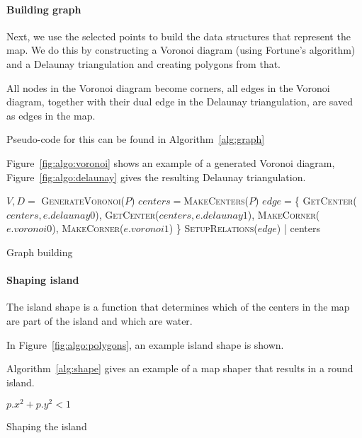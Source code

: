 \paragraph{Building graph}

Next, we use the selected points to build the data structures that represent the map.
We do this by constructing a Voronoi diagram (using Fortune's algorithm) and a Delaunay triangulation and creating polygons from that.

All nodes in the Voronoi diagram become corners, all edges in the Voronoi diagram, together with their dual edge in the Delaunay triangulation, are saved as edges in the map.

Pseudo-code for this can be found in Algorithm~\ref{alg:graph}

Figure~\ref{fig:algo:voronoi} shows an example of a generated Voronoi diagram, Figure~\ref{fig:algo:delaunay} gives the resulting Delaunay triangulation.

\begin{algo}[H]
\begin{sourcecode}
$V, D =$ \textsc{GenerateVoronoi}($P$)
$centers = $\textsc{MakeCenters}($P$)
	$edge = $\{
		\textsc{GetCenter}($centers, e.delaunay0$),
		\textsc{GetCenter}($centers, e.delaunay1$),
		\textsc{MakeCorner}($e.voronoi0$),
		\textsc{MakeCorner}($e.voronoi1$)
	\}
	\textsc{SetupRelations}($edge$)
|
\return centers
\qend
\end{sourcecode}
	\caption{Graph building}
	\label{alg:graph}
\end{algo}

\paragraph{Shaping island}

The island shape is a function that determines which of the centers in the map are part of the island and which are water.

In Figure~\ref{fig:algo:polygons}, an example island shape is shown.

Algorithm~\ref{alg:shape} gives an example of a map shaper that results in a round island.

\begin{algo}[H]
\begin{sourcecode}
\return $p.x^2 + p.y^2 < 1$
\qend
\end{sourcecode}
	\caption{Shaping the island}
	\label{alg:shape}
\end{algo}

